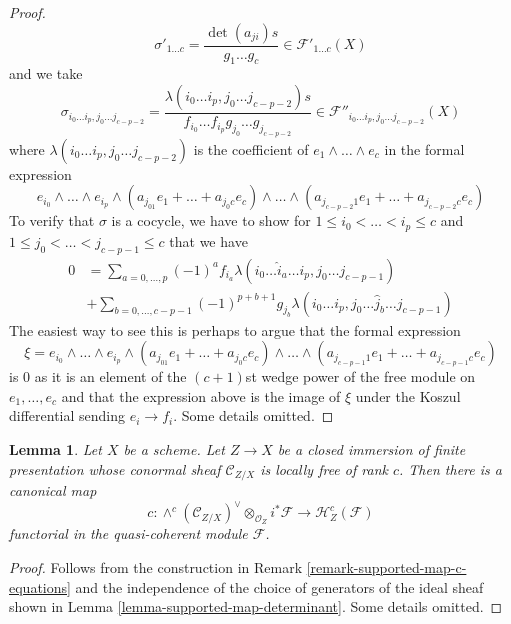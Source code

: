 \documentclass{stacks-project}
\theoremstyle{plain}
\newtheorem{lemma}[subsection]{Lemma}
\theoremstyle{definition}
\theoremstyle{remark}
\numberwithin{equation}{subsection}
\begin{document}
\begin{proof}
$$\sigma'_{1 \ldots c} = \frac{\det(a_{ji})s}{g_1 \ldots g_c} \in
\mathcal{F}'_{1 \ldots c}(X)
$$
and we take
$$
\sigma_{i_0 \ldots i_p, j_0 \ldots j_{c - p - 2}} =
\frac{\lambda(i_0 \ldots i_p, j_0 \ldots j_{c - p - 2})s}%
{f_{i_0} \ldots f_{i_p}g_{j_0} \ldots g_{j_{c - p - 2}}}
\in \mathcal{F}''_{i_0 \ldots i_p, j_0 \ldots j_{c - p - 2}}(X)
$$
where $\lambda(i_0 \ldots i_p, j_0 \ldots j_{c - p - 2})$
is the coefficient of $e_1 \wedge \ldots \wedge e_c$ in
the formal expression
$$
e_{i_0} \wedge \ldots \wedge e_{i_p} \wedge
(a_{j_01} e_1 + \ldots + a_{j_0c}e_c) \wedge \ldots \wedge
(a_{j_{c - p - 2}1} e_1 + \ldots + a_{j_{c - p - 2}c}e_c)
$$
To verify that $\sigma$ is a cocycle, we have to show for
$1 \leq i_0 < \ldots < i_p \leq c$ and
$1 \leq j_0 < \ldots < j_{c - p - 1} \leq c$
that we have
\begin{align*}
0 & =
\sum\nolimits_{a = 0, \ldots, p} (-1)^a
f_{i_a} \lambda(i_0 \ldots \hat i_a \ldots i_p, j_0 \ldots j_{c - p - 1}) \\
& +
\sum\nolimits_{b = 0, \ldots, c - p - 1} (-1)^{p + b + 1}g_{j_b}
\lambda(i_0 \ldots i_p, j_0 \ldots \hat j_b \ldots j_{c - p - 1})
\end{align*}
The easiest way to see this is perhaps to argue that the formal expression
$$
\xi = e_{i_0} \wedge \ldots \wedge e_{i_p} \wedge
(a_{j_01} e_1 + \ldots + a_{j_0c}e_c) \wedge \ldots \wedge
(a_{j_{c - p - 1}1} e_1 + \ldots + a_{j_{c - p - 1}c}e_c)
$$
is $0$ as it is an element of the $(c + 1)$st wedge power of the free module
on $e_1, \ldots, e_c$ and that the expression above is the image of
$\xi$ under the Koszul differential sending $e_i \to f_i$. Some details
omitted.
\end{proof}

\begin{lemma}
\label{lemma-supported-map-global}
Let $X$ be a scheme. Let $Z \to X$ be a closed immersion of finite presentation
whose conormal sheaf $\mathcal{C}_{Z/X}$ is locally free of rank $c$.
Then there is a canonical map
$$
c :
\wedge^c(\mathcal{C}_{Z/X})^\vee \otimes_{\mathcal{O}_Z} i^*\mathcal{F}
\longrightarrow
\mathcal{H}_Z^c(\mathcal{F})
$$
functorial in the quasi-coherent module $\mathcal{F}$.
\end{lemma}

\begin{proof}
Follows from the construction in
Remark \ref{remark-supported-map-c-equations}
and the independence of the choice
of generators of the ideal sheaf shown in
Lemma \ref{lemma-supported-map-determinant}.
Some details omitted.
\end{proof}
\end{document}
